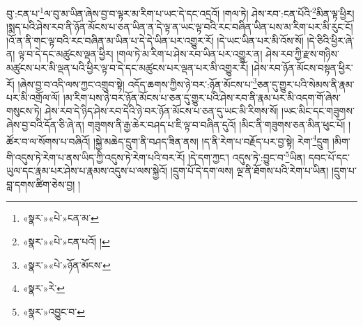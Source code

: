 བུ་:ངན་པ་\footnote{«སྣར་»«པེ་»ངན་མ་}ལ་བུ་མ་ཡིན་ཞེས་བྱ་བ་ལྟར་མ་རིག་པ་ཡང་དེ་དང་འདྲའོ། །གལ་ཏེ། ཤེས་རབ་:ངན་པོའི་\footnote{«སྣར་»«པེ་»ངན་པའོ། །}མིན་ལྟ་ཕྱིར། །སྨད་པའི་ཤེས་རབ་ནི་ཉོན་མོངས་པ་ཅན་ཡིན་ན་དེ་ལྟ་ན་ཡང་ལྟ་བའི་རང་བཞིན་ཡིན་པས་མ་རིག་པར་མི་རུང་ངོ། །འོ་ན་ནི་གང་ལྟ་བའི་རང་བཞིན་མ་ཡིན་པ་དེ་དེ་ཡིན་པར་འགྱུར་རོ། །དེ་ཡང་ཡིན་པར་མི་འོས་སོ། །དེ་ཅིའི་ཕྱིར་ཞེ་ན། ལྟ་བ་དེ་དང་མཚུངས་ལྡན་ཕྱིར། །གལ་ཏེ་མ་རིག་པ་ཤེས་རབ་ཡིན་པར་འགྱུར་ན། ཤེས་རབ་ཀྱི་རྫས་གཉིས་མཚུངས་པར་མི་ལྡན་པའི་ཕྱིར་ལྟ་བ་དེ་དང་མཚུངས་པར་ལྡན་པར་མི་འགྱུར་རོ། །ཤེས་རབ་ཉོན་མོངས་བསྟན་ཕྱིར་རོ། །ཞེས་བྱ་བ་འདི་ལས་ཀྱང་འགྲུབ་སྟེ། འདོད་ཆགས་ཀྱིས་ཉེ་བར་:ཉོན་མོངས་པ་\footnote{«སྣར་»«པེ་»ཉོན་མོངས་}ཅན་དུ་གྱུར་པའི་སེམས་ནི་རྣམ་པར་མི་འགྲོལ་ལོ། །མ་རིག་པས་ཉེ་བར་ཉོན་མོངས་པ་ཅན་དུ་གྱུར་པའི་ཤེས་རབ་ནི་རྣམ་པར་མི་འདག་གོ་ཞེས་གསུངས་ཏེ། ཤེས་རབ་དེ་ཉིད་ཤེས་རབ་དེའི་ཉེ་བར་ཉོན་མོངས་པ་ཅན་དུ་ཡང་མི་རིགས་སོ། །ཡང་མིང་དང་གཟུགས་ཞེས་བྱ་བའི་དོན་ཅི་ཞེ་ན། གཟུགས་ནི་རྒྱ་ཆེར་བཤད་པ་ཇི་ལྟ་བ་བཞིན་དུའོ། །མིང་ནི་གཟུགས་ཅན་མིན་ཕུང་པོ། །ཚོར་བ་ལ་སོགས་པ་བཞིའོ། །སྐྱེ་མཆེད་དྲུག་ནི་བཤད་ཟིན་ནས། །ད་ནི་རེག་པ་བརྗོད་པར་བྱ་སྟེ། རེག་\footnote{«སྣར་»རེ་}དྲུག །མིག་གི་འདུས་ཏེ་རེག་པ་ནས་ཡིད་ཀྱི་འདུས་ཏེ་རེག་པའི་བར་རོ། །དེ་དག་ཀྱང་། འདུས་ཏེ་:བྱུང་བ་\footnote{«སྣར་»འབྱུང་བ་}ཡིན། དབང་པོ་དང་ཡུལ་དང་རྣམ་པར་ཤེས་པ་རྣམས་འདུས་པ་ལས་སྐྱེའོ། །དྲུག་པོ་དེ་དག་ལས། ལྔ་ནི་ཐོགས་པའི་རེག་པ་ཡིན། །དྲུག་པ་བླ་དགས་ཚིག་ཅེས་བྱ། །

